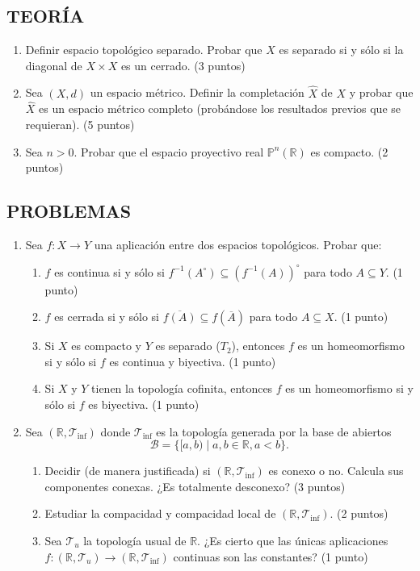 \subsection*{TEORÍA}
\begin{enumerate}
    \item Definir espacio topológico separado. Probar que $X$ es separado si y sólo si la diagonal de $X \times X$ es un cerrado. \hfill (3 puntos)
    \item Sea $(X, d)$ un espacio métrico. Definir la completación $\widehat{X}$ de $X$ y probar que $\widehat{X}$ es un espacio métrico completo (probándose los resultados previos que se requieran). \hfill (5 puntos)
    \item Sea $n > 0$. Probar que el espacio proyectivo real $\mathbb{P}^n(\mathbb{R})$ es compacto. \hfill (2 puntos)
\end{enumerate}

\subsection*{PROBLEMAS}
\begin{enumerate}
    \item Sea $f: X \to Y$ una aplicación entre dos espacios topológicos. Probar que:
    \begin{enumerate}[label=(\alph*)]
        \item $f$ es continua si y sólo si $f^{-1}(A^\circ) \subseteq (f^{-1}(A))^\circ$ para todo $A \subseteq Y$. \hfill (1 punto)
        \item $f$ es cerrada si y sólo si $\overline{f(A)} \subseteq f(\overline{A})$ para todo $A \subseteq X$. \hfill (1 punto)
        \item Si $X$ es compacto y $Y$ es separado ($T_2$), entonces $f$ es un homeomorfismo si y sólo si $f$ es continua y biyectiva. \hfill (1 punto)
        \item Si $X$ y $Y$ tienen la topología cofinita, entonces $f$ es un homeomorfismo si y sólo si $f$ es biyectiva. \hfill (1 punto)
    \end{enumerate}
    
    \item Sea $(\mathbb{R}, \mathcal{T}_{\inf})$ donde $\mathcal{T}_{\inf}$ es la topología generada por la base de abiertos 
    \[
    \mathcal{B} = \{[a, b) \mid a, b \in \mathbb{R}, a < b\}.
    \]
    \begin{enumerate}[label=(\alph*)]
        \item Decidir (de manera justificada) si $(\mathbb{R}, \mathcal{T}_{\inf})$ es conexo o no. Calcula sus componentes conexas. ¿Es totalmente desconexo? \hfill (3 puntos)
        \item Estudiar la compacidad y compacidad local de $(\mathbb{R}, \mathcal{T}_{\inf})$. \hfill (2 puntos)
        \item Sea $\mathcal{T}_u$ la topología usual de $\mathbb{R}$. ¿Es cierto que las únicas aplicaciones $f: (\mathbb{R}, \mathcal{T}_u) \to (\mathbb{R}, \mathcal{T}_{\inf})$ continuas son las constantes? \hfill (1 punto)
    \end{enumerate}
\end{enumerate}

